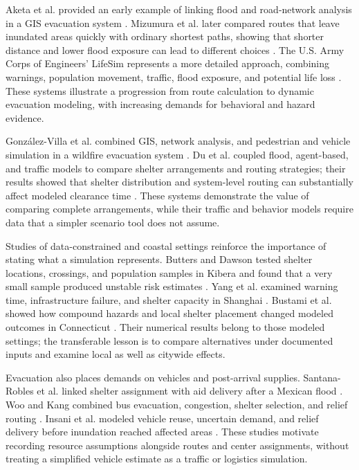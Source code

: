 Aketa et al. provided an early example of linking flood and road-network analysis in a GIS evacuation system \cite{aketa2007}. Mizumura et al. later compared routes that leave inundated areas quickly with ordinary shortest paths, showing that shorter distance and lower flood exposure can lead to different choices \cite{mizumura2024}. The U.S. Army Corps of Engineers' LifeSim represents a more detailed approach, combining warnings, population movement, traffic, flood exposure, and potential life loss \cite{lifesim2021}. These systems illustrate a progression from route calculation to dynamic evacuation modeling, with increasing demands for behavioral and hazard evidence.

Gonz\'alez-Villa et al. combined GIS, network analysis, and pedestrian and vehicle simulation in a wildfire evacuation system \cite{gonzalezvilla2022}. Du et al. coupled flood, agent-based, and traffic models to compare shelter arrangements and routing strategies; their results showed that shelter distribution and system-level routing can substantially affect modeled clearance time \cite{du2023}. These systems demonstrate the value of comparing complete arrangements, while their traffic and behavior models require data that a simpler scenario tool does not assume.

Studies of data-constrained and coastal settings reinforce the importance of stating what a simulation represents. Butters and Dawson tested shelter locations, crossings, and population samples in Kibera and found that a very small sample produced unstable risk estimates \cite{butters2025}. Yang et al. examined warning time, infrastructure failure, and shelter capacity in Shanghai \cite{yang2025}. Bustami et al. showed how compound hazards and local shelter placement changed modeled outcomes in Connecticut \cite{bustami2026}. Their numerical results belong to those modeled settings; the transferable lesson is to compare alternatives under documented inputs and examine local as well as citywide effects.

Evacuation also places demands on vehicles and post-arrival supplies. Santana-Robles et al. linked shelter assignment with aid delivery after a Mexican flood \cite{santana2024}. Woo and Kang combined bus evacuation, congestion, shelter selection, and relief routing \cite{woo2025}. Insani et al. modeled vehicle reuse, uncertain demand, and relief delivery before inundation reached affected areas \cite{insani2024}. These studies motivate recording resource assumptions alongside routes and center assignments, without treating a simplified vehicle estimate as a traffic or logistics simulation.

